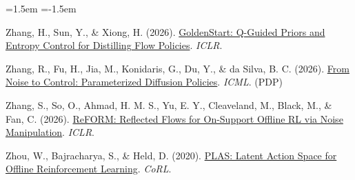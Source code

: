 \begin{list}{}{\leftmargin=1.5em \itemindent=-1.5em \itemsep=2pt \parsep=0pt}
\item {}Zhang, H., Sun, Y., \& Xiong, H. (2026). \href{https://arxiv.org/abs/2603.14245}{GoldenStart: Q-Guided Priors and Entropy Control for Distilling Flow Policies}. \emph{ICLR}.
\item {}Zhang, R., Fu, H., Jia, M., Konidaris, G., Du, Y., \& da Silva, B. C. (2026). \href{https://arxiv.org/abs/2606.00336}{From Noise to Control: Parameterized Diffusion Policies}. \emph{ICML}. (PDP)
\item {}Zhang, S., So, O., Ahmad, H. M. S., Yu, E. Y., Cleaveland, M., Black, M., \& Fan, C. (2026). \href{https://arxiv.org/abs/2602.05051}{ReFORM: Reflected Flows for On-Support Offline RL via Noise Manipulation}. \emph{ICLR}.
\item {}Zhou, W., Bajracharya, S., \& Held, D. (2020). \href{https://arxiv.org/abs/2011.07213}{PLAS: Latent Action Space for Offline Reinforcement Learning}. \emph{CoRL}.
\end{list}
